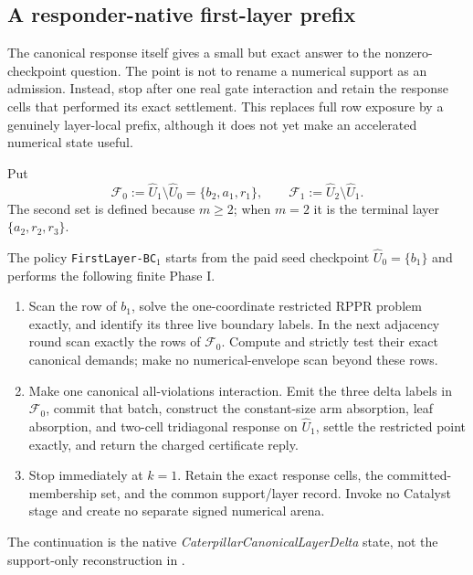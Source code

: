 \subsection{A responder-native first-layer prefix}
\label{sec:branch-caterpillar-first-layer-prefix}

The canonical response itself gives a small but exact answer to the
nonzero-checkpoint question.  The point is not to rename a numerical support
as an admission.  Instead, stop after one real gate interaction and retain
the response cells that performed its exact settlement.  This replaces full
row exposure by a genuinely layer-local prefix, although it does not yet make
an accelerated numerical state useful.

Put
\begin{equation}
 \mathcal F_0:=\widehat U_1\setminus\widehat U_0
 =\{b_2,a_1,r_1\},
 \qquad
 \mathcal F_1:=\widehat U_2\setminus\widehat U_1.
 \label{eq:branch-caterpillar-first-layer-sets}
\end{equation}
The second set is defined because $m\geq2$; when $m=2$ it is the terminal
layer $\{a_2,r_2,r_3\}$.

\begin{definition}
\label{def:branch-caterpillar-first-layer-policy}
The policy \texttt{FirstLayer-BC}$_1$ starts from the paid seed checkpoint
$\widehat U_0=\{b_1\}$ and performs the following finite Phase I.
\begin{enumerate}
 \item Scan the row of $b_1$, solve the one-coordinate restricted RPPR
       problem exactly, and identify its three live boundary labels.  In the
       next adjacency round scan exactly the rows of
       $\mathcal F_0$.  Compute and strictly test their exact canonical
       demands; make no numerical-envelope scan beyond these rows.
 \item Make one canonical all-violations interaction.  Emit the three delta
       labels in $\mathcal F_0$, commit that batch, construct the constant-size
       arm absorption, leaf absorption, and two-cell tridiagonal response on
       $\widehat U_1$, settle the restricted point exactly, and return the
       charged certificate reply.
 \item Stop immediately at $k=1$.  Retain the exact response cells, the
       committed-membership set, and the common support/layer record.  Invoke
       no Catalyst stage and create no separate signed numerical arena.
\end{enumerate}
The continuation is the native \emph{CaterpillarCanonicalLayerDelta} state,
not the support-only reconstruction in
.
\end{definition}

